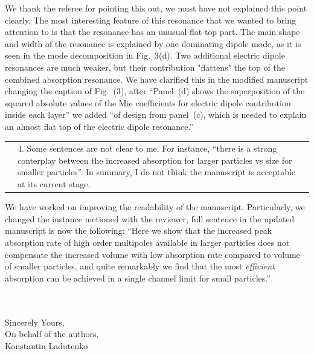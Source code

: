 \documentclass[a4paper]{article}
\begin{document}
We thank the referee for pointing this out, we must have not explained
this point clearly. The most interesting feature of this resonance
that we wanted to bring attention to is that the resonance has an
unusual flat top part. The main shape and width of the resonance is
explained by one dominating dipole mode, as it is seen in the mode
decomposition in Fig.~3(d). Two additional electric dipole resonances
are much weaker, but their contribution "flattens" the top of the
combined absorption resonance. We have clarified this in the modified
manuscript changing the caption of Fig.~(3), after ``Panel~(d) shows
the superposition of the squared absolute values of the Mie
coefficients for electric dipole contribution inside each layer'' we
added ``of design from panel~(c), which is needed to explain an almost
flat top of the electric dipole resonance.''


\begin{tabular}[!H]{l|p{}}
\quad & 4.  Some sentences are not clear to me. For instance, “there
is a strong conterplay between the increased absorption for larger
particles vs size for smaller particles”.  In summary, I do not think
the manuscript is acceptable at its current stage.
\end{tabular}%

We have worked on improving the readability of the
manuscript. Particularly, we changed the instance metioned with the
reviewer, full sentence in the updated manuscript is now the
following: ``Here we show that the increased peak absorption rate of
high order multipoles available in larger particles does not
compensate the increased volume with low absorption rate compared to
volume of smaller particles, and quite remarkably we find that the
most {\em efficient} absorption can be achieved in a single channel
limit for small particles.''

\\
\vspace{10pt}
\\
Sincerely Yours,\\
On behalf of the authors,\\
Konstantin Ladutenko
\end{document}
